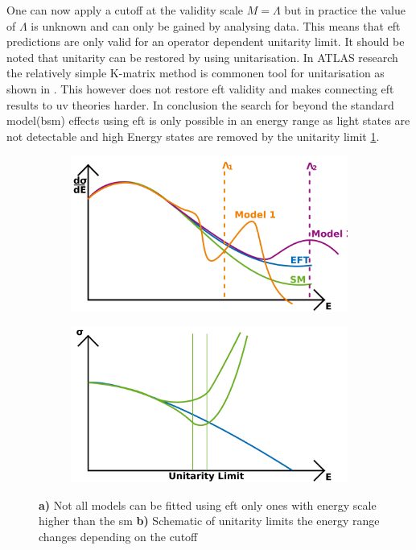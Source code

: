 \documentclass[../Bachelorarbeit.tex]{subfiles}
\begin{document}
\newpage
One can now apply a cutoff at the validity scale $M=\Lambda$ but in practice the value of $\Lambda$ is unknown and can only be gained by analysing data. This means that \acrshort{eft} predictions are only valid for an operator dependent unitarity limit.
It should be noted that unitarity can be restored by using unitarisation. In ATLAS research the relatively simple K-matrix method is commonen tool for unitarisation as shown in \cite{Kilian.2015}. This however does not restore \acrshort{eft} validity and
makes connecting \acrshort{eft} results to \acrshort{uv} theories harder. In conclusion the search for beyond the standard model(\acrshort{bsm}) effects using \acrshort{eft} is only possible in an energy range as light states are not detectable and high Energy states are removed by the unitarity limit \ref{fig:EFT_validity}.
\begin{figure}[h]
    \centering
    \begin{subfigure}{0.45\textwidth}
        \centering
        \includegraphics[width=\textwidth]{images/EFT_validity.png}
        \caption{}
    \end{subfigure}
    \begin{subfigure}{0.45\textwidth}
        \centering
        \includegraphics[width=\textwidth]{images/EFT_cross_section.png}
        \caption{}
    \end{subfigure}
    \caption{\textbf{a)} Not all models can be fitted using \acrshort{eft} only ones with energy scale higher than the \acrshort{sm} \cite{Brivio.2017}\textbf{b)} Schematic of unitarity limits the energy range changes depending on the cutoff \cite{MichaSzleper.} }
    \label{fig:EFT_validity}
\end{figure}
\end{document}
